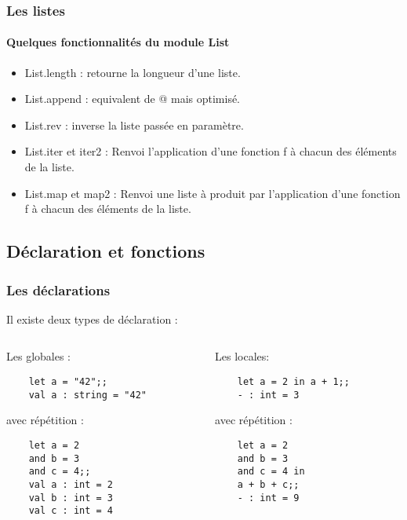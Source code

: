 \begin{frame}[fragile]
	\frametitle{Les listes}
	\framesubtitle{Quelques fonctionnalités du module List}
	\begin{itemize}
	
	\item List.length : retourne la longueur d'une liste.	
	
	\item List.append : equivalent de @ mais optimisé.
	
	\item List.rev : inverse la liste passée en paramètre.
	
	\item List.iter et iter2 : Renvoi l'application d'une fonction f à chacun des éléments de la liste.

	\item List.map et map2 : Renvoi une liste à produit par l'application d'une fonction f à chacun des éléments de la liste.

	\end{itemize}
\end{frame}


\subsection{Déclaration et fonctions} %
\begin{frame}[fragile]
      \frametitle{Les déclarations}
      Il existe deux types de déclaration :
     \begin{columns}[t]
	\begin{column}{5cm}
	\begin{block}{Les globales :}
	\begin{lstlisting}
	let a = "42";;
	val a : string = "42"
	\end{lstlisting}
	avec répétition :
	\begin{lstlisting}
	let a = 2
	and b = 3
	and c = 4;;
	val a : int = 2
	val b : int = 3
	val c : int = 4
	\end{lstlisting}
      \end{block}
	\end{column}
      \begin{column}{5cm}
	\begin{block}{Les locales:}
	\begin{lstlisting}
	let a = 2 in a + 1;;
	- : int = 3
	\end{lstlisting}
	avec répétition :
	\begin{lstlisting}
	let a = 2
	and b = 3
	and c = 4 in
	a + b + c;;
	- : int = 9
	\end{lstlisting}
	\end{block}
      \end{column}
	\end{columns}
\end{frame}

